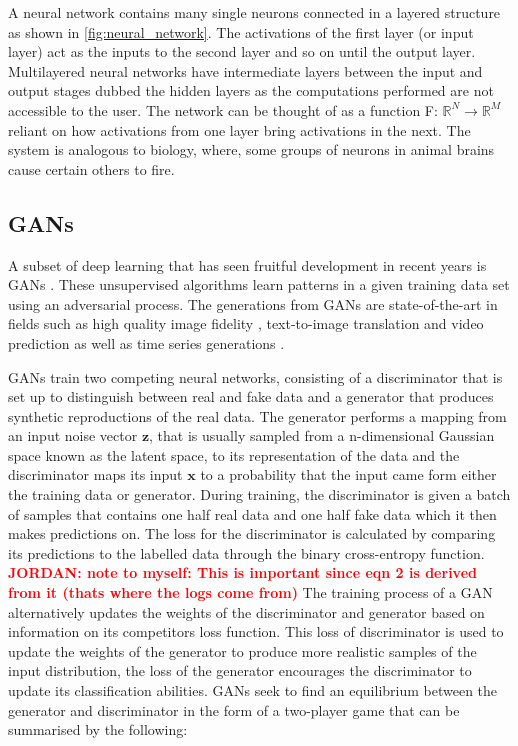 \documentclass[12pt]{iopart}
\newcommand{\jordan}[1]{\textbf{\textcolor{red}{JORDAN: #1}}}
\begin{document}
A neural network contains many single neurons connected in a layered structure as shown in \cref{fig:neural_network}. The activations of the first layer (or input layer) act as the inputs to the second layer and so on until the output layer. Multilayered neural networks have intermediate layers between the input and output stages dubbed the hidden layers as the computations performed are not accessible to the user. The network can be thought of as a function F: $\mathbb{R}^N\rightarrow \mathbb{R}^M $ reliant on how activations from one layer bring activations in the next. The system is analogous to biology, where, some groups of neurons in animal brains cause certain others to fire. 

\subsection{GANs}

A subset of deep learning that has seen fruitful development in recent years is \acp{GAN} \cite{Goodfellow2014}. These unsupervised algorithms learn
patterns in a given training data set using an adversarial process. The
generations from \acp{GAN} are state-of-the-art in fields such as high quality image
fidelity \cite{brock2018large,karras2019analyzing}, text-to-image translation
\cite{reed2016generative} and video prediction \cite{liang2017dual} as well as
time series generations \cite{esteban2017realvalued}. 

%
\acp{GAN} train two competing neural networks, consisting of a discriminator
that is set up to distinguish between real and fake data and a generator that
produces synthetic reproductions of the real data. The generator performs a
mapping from an input noise vector $\mathbf{z}$, that is usually sampled from a n-dimensional Gaussian space known as the latent space, to its representation of the
data and the discriminator maps its input $\mathbf{x}$ to a probability that
the input came form either the training data or generator.  During training,
the discriminator is given a batch of samples that contains one half real data
and one half fake data which it then makes predictions on. The loss for the
discriminator is calculated by comparing its predictions to the labelled data
through the binary cross-entropy function. \jordan{note to myself: This is important since eqn 2 is derived from it (thats where the logs come from)} The training process of a \ac{GAN}
alternatively updates the weights of the discriminator and generator based on
information on its competitors loss function. This loss of discriminator is
used to update the weights of the generator to produce more realistic samples
of the input distribution, the loss of the generator encourages the
discriminator to update its classification abilities. GANs seek to find an equilibrium between the generator and discriminator in the form of a two-player game that can be summarised by the following:  
\end{document}
